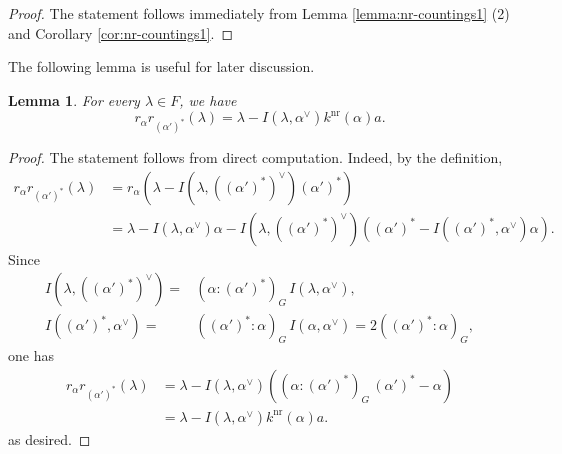\documentclass[11pt]{amsart}
\newcommand{\nr}{\mathrm{nr}}
\newtheorem{lemma}[thm]{Lemma}%
\begin{document}
{\begin{proof}
The statement follows immediately from Lemma \ref{lemma:nr-countings1} (2) 
and Corollary \ref{cor:nr-countings1}.
\end{proof}
The following lemma is useful for later discussion. 

\begin{lemma}\label{lemma:translation}
For every $\lambda\in F$, we have
\begin{equation}\label{eq:translation}
r_{\alpha}r_{(\alpha')^\ast}(\lambda) = \lambda - I(\lambda, \alpha^\vee)
k^{\nr}(\alpha)a.
\end{equation}
\end{lemma}
\begin{proof}
The statement follows {from} direct computation. 
Indeed, by the definition,  
\begin{align*}
r_{\alpha} r_{(\alpha')^\ast}(\lambda) &= 
r_{\alpha}\left(\lambda - I(\lambda,  ((\alpha')^\ast)^\vee)(\alpha')^\ast \right)\\
&=\lambda - I(\lambda, \alpha^\vee)\alpha - I(\lambda,((\alpha')^\ast)^\vee)
\left((\alpha')^\ast - I((\alpha')^\ast, \alpha^\vee)\alpha\right). 
\end{align*}
Since 
\begin{align*}
I(\lambda,((\alpha')^\ast)^\vee) = 
&(\alpha:(\alpha')^\ast)_G\,
I(\lambda, \alpha^\vee), \\
I((\alpha')^\ast,\alpha^\vee) =
&((\alpha')^\ast:\alpha)_G \,
I(\alpha,\alpha^\vee) = 2((\alpha')^\ast:\alpha)_G, 
\end{align*}
one has
\begin{align*}
r_{\alpha} r_{(\alpha')^\ast}(\lambda)  &= 
\lambda - I(\lambda, \alpha^\vee)\left((\alpha:(\alpha')^\ast)_G\, 
(\alpha')^\ast - \alpha\right) \\
&=\lambda - I(\lambda, \alpha^\vee)k^{\nr}(\alpha)a.
\end{align*}
as desired. 
\end{proof}


}
\end{document}
